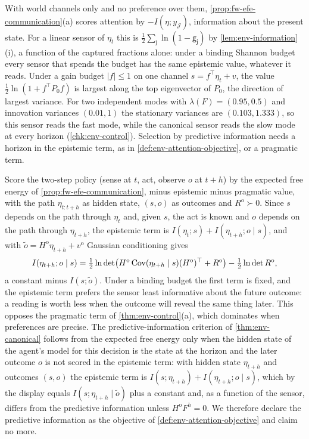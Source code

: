 \begin{remark}\label{rem:env-efe-horizon-free}
With world channels only and no preference over them, \cref{prop:fw-efe-communication}(a) scores attention by $-I(\eta;y_{\mathcal J})$, information about the present state. For a linear sensor of $\eta_t$ this is $\frac12\sum_{\mathsf j}\ln(1-\mathsf g_{\mathsf j})$ by \cref{lem:env-information}(i), a function of the captured fractions alone: under a binding Shannon budget every sensor that spends the budget has the same epistemic value, whatever it reads. Under a gain budget $\lvert f\rvert\le1$ on one channel $s=f^\top\eta_t+v$, the value $\frac12\ln(1+f^\top P_0f)$ is largest along the top eigenvector of $P_0$, the direction of largest variance. For two independent modes with $\lambda(F)=(0.95,0.5)$ and innovation variances $(0.01,1)$ the stationary variances are $(0.103,1.333)$, so this sensor reads the fast mode, while the canonical sensor reads the slow mode at every horizon (\cref{chk:env-control}). Selection by predictive information needs a horizon in the epistemic term, as in \cref{def:env-attention-objective}, or a pragmatic term.
\end{remark}

\begin{remark}\label{rem:env-two-step}
Score the two-step policy (sense at $t$, act, observe $o$ at $t+h$) by the expected free energy of \cref{prop:fw-efe-communication}, minus epistemic minus pragmatic value, with the path $\eta_{t:t+h}$ as hidden state, $(s,o)$ as outcomes and $R^{\mathrm o}\succ0$. Since $s$ depends on the path through $\eta_t$ and, given $s$, the act is known and $o$ depends on the path through $\eta_{t+h}$, the epistemic term is $I(\eta_t;s)+I(\eta_{t+h};o\mid s)$, and with $\tilde o=H^{\mathrm o}\eta_{t+h}+v^{\mathrm o}$ Gaussian conditioning gives
\[
I(\eta_{t+h};o\mid s)=\tfrac12\ln\det\bigl(H^{\mathrm o}\operatorname{Cov}(\eta_{t+h}\mid s)(H^{\mathrm o})^\top+R^{\mathrm o}\bigr)-\tfrac12\ln\det R^{\mathrm o},
\]
a constant minus $I(s;\tilde o)$. Under a binding budget the first term is fixed, and the epistemic term prefers the sensor least informative about the future outcome: a reading is worth less when the outcome will reveal the same thing later. This opposes the pragmatic term of \cref{thm:env-control}(a), which dominates when preferences are precise. The predictive-information criterion of \cref{thm:env-canonical} follows from the expected free energy only when the hidden state of the agent's model for this decision is the state at the horizon and the later outcome $o$ is not scored in the epistemic term: with hidden state $\eta_{t+h}$ and outcomes $(s,o)$ the epistemic term is $I(s;\eta_{t+h})+I(\eta_{t+h};o\mid s)$, which by the display equals $I(s;\eta_{t+h}\mid\tilde o)$ plus a constant and, as a function of the sensor, differs from the predictive information unless $H^{\mathrm o}F^h=0$. We therefore declare the predictive information as the objective of \cref{def:env-attention-objective} and claim no more.
\end{remark}

